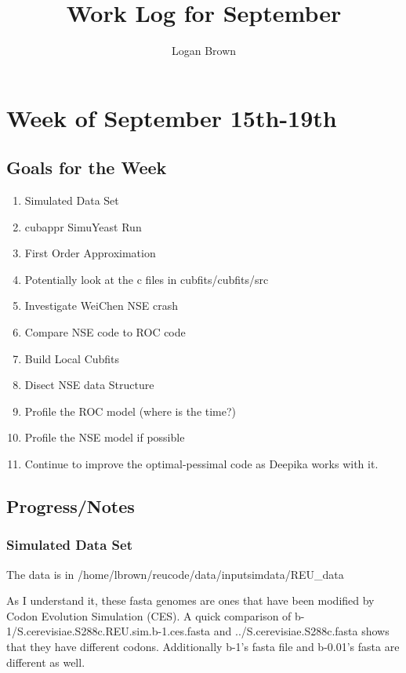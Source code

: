 \documentclass[11pt]{article} %
\title{Work Log for September}
\author{Logan Brown}
\begin{document}
\maketitle


\setcounter{section}{2} %
\setcounter{subsection}{-1}
\setcounter{subsubsection}{0}

\section{Week of September 15th-19th}
\subsection{Goals for the Week}
\begin{enumerate}
\item Simulated Data Set
\item cubappr SimuYeast Run
\item First Order Approximation
\item Potentially look at the c files in cubfits/cubfits/src
\item Investigate WeiChen NSE crash
\item Compare NSE code to ROC code
\item Build Local Cubfits
\item Disect NSE data Structure
\item Profile the ROC model (where is the time?)
\item Profile the NSE model if possible
\item Continue to improve the optimal-pessimal code as Deepika works with it.
\end{enumerate}

\subsection{Progress/Notes}

\subsubsection{Simulated Data Set}
The data is in /home/lbrown/reucode/data/inputsimdata/REU\_data

As I understand it, these fasta genomes are ones that have been modified by Codon Evolution Simulation (CES). A quick comparison of  b-1/S.cerevisiae.S288c.REU.sim.b-1.ces.fasta and ../S.cerevisiae.S288c.fasta shows that they have different codons. Additionally b-1's fasta file and b-0.01's fasta are different as well.
\end{document}
